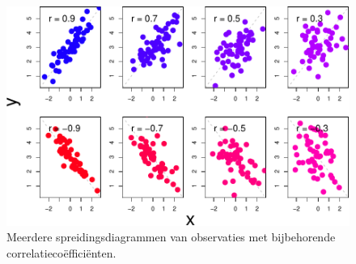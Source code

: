 \documentclass[
]{book}
\begin{document}
\begin{figure}

{\centering \includegraphics{KMS-NL_files/figure-latex/cor-scatter-1} 

}

\caption{Meerdere spreidingsdiagrammen van observaties met bijbehorende correlatiecoëfficiënten.}\label{fig:cor-scatter}
\end{figure}
\end{document}
